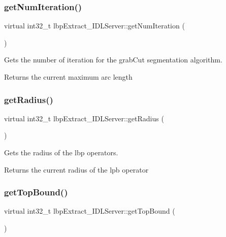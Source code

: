 \subsubsection{\texorpdfstring{get\+Num\+Iteration()}{getNumIteration()}}
{\footnotesize\ttfamily virtual int32\+\_\+t lbp\+Extract\+\_\+\+I\+D\+L\+Server\+::get\+Num\+Iteration (\begin{DoxyParamCaption}{ }\end{DoxyParamCaption})\hspace{0.3cm}{\ttfamily [virtual]}}



Gets the number of iteration for the grab\+Cut segmentation algorithm. 

\begin{DoxyReturn}{Returns}
the current maximum arc length 
\end{DoxyReturn}
\mbox{\label{classlbpExtract__IDLServer_a8c9a3adfcb9e7d37c4388bc3950da23b}} 
\subsubsection{\texorpdfstring{get\+Radius()}{getRadius()}}
{\footnotesize\ttfamily virtual int32\+\_\+t lbp\+Extract\+\_\+\+I\+D\+L\+Server\+::get\+Radius (\begin{DoxyParamCaption}{ }\end{DoxyParamCaption})\hspace{0.3cm}{\ttfamily [virtual]}}



Gets the radius of the lbp operators. 

\begin{DoxyReturn}{Returns}
the current radius of the lpb operator 
\end{DoxyReturn}
\mbox{\label{classlbpExtract__IDLServer_a693ea8bf9638a27fdf3f7d40f7ad8f51}} 
\subsubsection{\texorpdfstring{get\+Top\+Bound()}{getTopBound()}}
{\footnotesize\ttfamily virtual int32\+\_\+t lbp\+Extract\+\_\+\+I\+D\+L\+Server\+::get\+Top\+Bound (\begin{DoxyParamCaption}{ }\end{DoxyParamCaption})\hspace{0.3cm}{\ttfamily [virtual]}}



